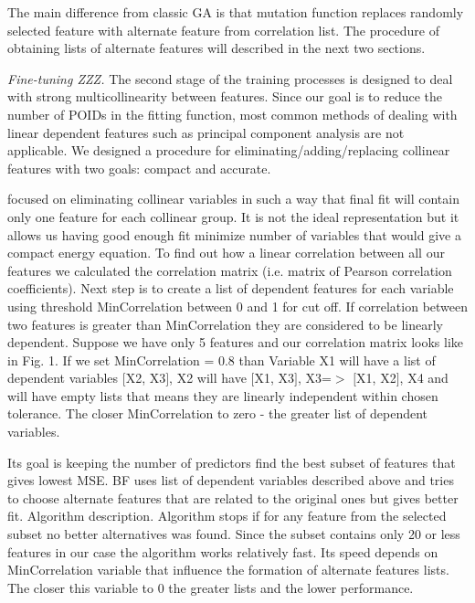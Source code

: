 \documentclass[aps,prl,reprint,amsmath,amssymb,nature]{revtex4-1}
\begin{document}
The main difference from classic GA is that mutation function replaces 
randomly selected feature with alternate feature from correlation list. 
The procedure of obtaining lists of alternate features will described in 
the next two sections.

\textit{Fine-tuning ZZZ.} The second stage of the training processes 
is designed to deal with strong multicollinearity between features. 
Since our goal is to reduce the number of POIDs in the fitting function, 
most common methods of dealing with linear dependent features such as 
principal component analysis are not applicable. We designed a procedure 
for eliminating/adding/replacing collinear features with two goals: 
compact and accurate. 

focused on eliminating collinear variables in such a way that final fit 
will contain only one feature for each collinear group. It is not the 
ideal representation but it allows us having good enough fit minimize 
number of variables that would give a compact energy equation. To find 
out how a linear correlation between all our features we calculated 
the correlation matrix (i.e. matrix of Pearson correlation coefficients). Next step is to 
create a list of dependent features for each variable using threshold 
MinCorrelation between 0 and 1 for cut off. If correlation between two 
features is greater than MinCorrelation they are considered to be 
linearly dependent. Suppose we have only 5 features and our correlation 
matrix looks like in Fig. 1. If we set MinCorrelation = 0.8 than 
Variable X1 will have a list of dependent variables $[$X2, X3$]$, X2 
will have $[$X1, X3$]$, X3=$>$ $[$X1, X2$]$, X4 and will have empty 
lists that means they are linearly independent within chosen tolerance. 
The closer MinCorrelation to zero - the greater list of dependent 
variables. 

Its goal is keeping the number of predictors find the best subset of 
features that gives lowest MSE. BF uses list of dependent variables 
described above and tries to choose alternate features that are related 
to the original ones but gives better fit. Algorithm description. 
Algorithm stops if for any feature from the selected subset no better 
alternatives was found. Since the subset contains only 20 or less 
features in our case the algorithm works relatively fast. Its speed 
depends on MinCorrelation variable that influence the formation of 
alternate features lists. The closer this variable to 0 the greater 
lists and the lower performance. 
\end{document}
